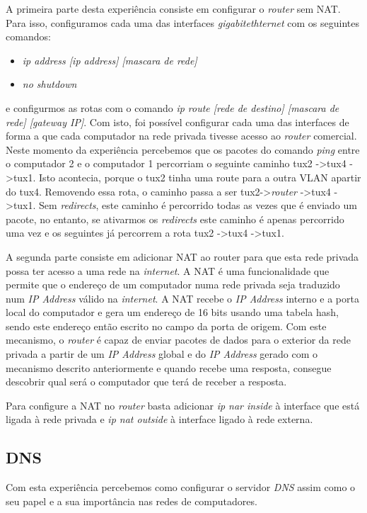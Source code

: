 \documentclass[a4paper]{article}
\begin{document}
A primeira parte desta experiência consiste em configurar o \textit{router} sem NAT. Para isso, configuramos cada uma das interfaces \textit{gigabitethternet} com os seguintes comandos:
\begin{itemize}
	\item \textit{ip address [ip address] [mascara de rede]}
	\item \textit{no shutdown}
\end{itemize}
e configurmos as rotas com o comando \textit{ip route [rede de destino] [mascara de rede] [gateway IP]}. Com isto, foi possível configurar cada uma das interfaces de forma a que cada computador na rede privada tivesse acesso ao \textit{router} comercial. Neste momento da experiência percebemos que os pacotes do comando \textit{ping} entre o computador 2 e o computador 1 percorriam o seguinte caminho tux2 -\textgreater tux4 -\textgreater tux1. Isto acontecia, porque o tux2 tinha uma route para a outra VLAN apartir do tux4. Removendo essa rota, o caminho passa a ser tux2-\textgreater \textit{router} -\textgreater tux4 -\textgreater tux1. Sem \textit{redirects}, este caminho é percorrido todas as vezes que é enviado um pacote, no entanto, se ativarmos os \textit{redirects} este caminho é apenas percorrido uma vez e os seguintes já percorrem a rota tux2 -\textgreater tux4 -\textgreater tux1.

A segunda parte consiste em adicionar NAT ao router para que esta rede privada possa ter acesso a uma rede na \textit{internet}. A NAT é uma funcionalidade que permite que o endereço de um computador numa rede privada seja traduzido num \textit{IP Address} válido na \textit{internet}. A NAT recebe o \textit{IP Address} interno e a porta local do computador e gera um endereço de 16 bits usando uma tabela hash, sendo este endereço então escrito no campo da porta de origem. Com este mecanismo, o \textit{router} é capaz de enviar pacotes de dados para o exterior da rede privada a partir de um \textit{IP Address} global e do \textit{IP Address} gerado com o mecanismo descrito anteriormente e quando recebe uma resposta, consegue descobrir qual será o computador que terá de receber a resposta.

Para configure a NAT no \textit{router} basta adicionar \textit{ip nar inside} à interface que está ligada à rede privada e \textit{ip nat outside} à interface ligado à rede externa.
\subsection{DNS}
Com esta experiência percebemos como configurar o servidor \textit{DNS} assim como o seu papel e a sua importância nas redes de computadores.
\end{document}
